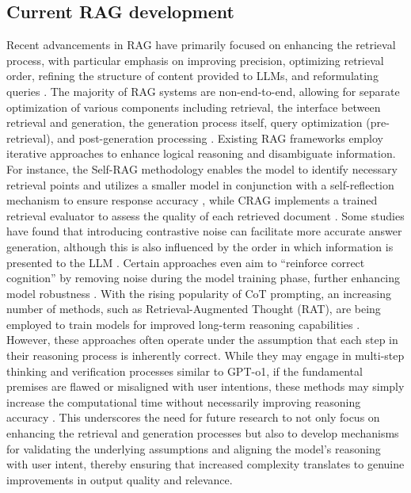 \subsection{Current RAG development}
Recent advancements in RAG have primarily focused on enhancing the retrieval process, with particular emphasis on improving precision, optimizing retrieval order, refining the structure of content provided to LLMs, and reformulating queries \cite{lewis2020retrieval}. The majority of RAG systems are non-end-to-end, allowing for separate optimization of various components including retrieval, the interface between retrieval and generation, the generation process itself, query optimization (pre-retrieval), and post-generation processing \cite{gao2023retrieval}. Existing RAG frameworks employ iterative approaches to enhance logical reasoning and disambiguate information. For instance, the Self-RAG methodology enables the model to identify necessary retrieval points and utilizes a smaller model in conjunction with a self-reflection mechanism to ensure response accuracy \cite{asai2023self}, while CRAG implements a trained retrieval evaluator to assess the quality of each retrieved document \cite{yan2024corrective}. Some studies have found that introducing contrastive noise can facilitate more accurate answer generation, although this is also influenced by the order in which information is presented to the LLM \cite{cuconasu2024power}. Certain approaches even aim to ``reinforce correct cognition'' by removing noise during the model training phase, further enhancing model robustness \cite{zhang2024raft}.
With the rising popularity of CoT prompting, an increasing number of methods, such as Retrieval-Augmented Thought (RAT), are being employed to train models for improved long-term reasoning capabilities \cite{wang2024rat}. However, these approaches often operate under the assumption that each step in their reasoning process is inherently correct. While they may engage in multi-step thinking and verification processes similar to GPT-o1, if the fundamental premises are flawed or misaligned with user intentions, these methods may simply increase the computational time without necessarily improving reasoning accuracy \cite{es2023ragas}. This underscores the need for future research to not only focus on enhancing the retrieval and generation processes but also to develop mechanisms for validating the underlying assumptions and aligning the model's reasoning with user intent, thereby ensuring that increased complexity translates to genuine improvements in output quality and relevance.

